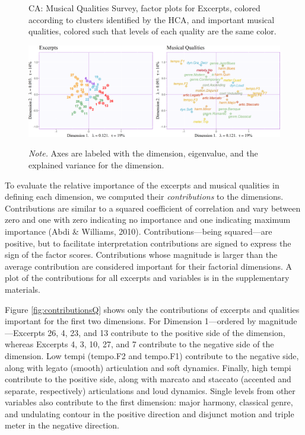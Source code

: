 \documentclass[
  english,
  man,floatsintext]{apa6}
\begin{document}
\begin{figure}   
  \centering  
  \caption{CA: Musical Qualities Survey, factor plots for Excerpts, colored according to clusters identified by the HCA, and important musical qualities, colored such that levels of each quality are the same color.}
    \includegraphics{./Music-Descriptor-Space_files/figure-latex/factormapsQcode-1.png}
  \label{fig:factormapsQ}
  \caption*{\footnotesize \textit{Note.} Axes are labeled with the dimension, eigenvalue, and the explained variance for the dimension. }
\end{figure}

To evaluate the relative importance of the excerpts and musical qualities in defining each dimension, we computed their \emph{contributions} to the dimensions. Contributions are similar to a squared coefficient of correlation and vary between zero and one with zero indicating no importance and one indicating maximum importance (Abdi \& Williams, 2010). Contributions---being squared---are positive, but to facilitate interpretation contributions are signed to express the sign of the factor scores. Contributions whose magnitude is larger than the average contribution are considered important for their factorial dimensions. A plot of the contributions for all excerpts and variables is in the supplementary materials.

Figure \ref{fig:contributionsQ} shows only the contributions of excerpts and qualities important for the first two dimensions. For Dimension 1---ordered by magnitude---Excerpts 26, 4, 23, and 13 contribute to the positive side of the dimension, whereas Excerpts 4, 3, 10, 27, and 7 contribute to the negative side of the dimension. Low tempi (tempo.F2 and tempo.F1) contribute to the negative side, along with legato (smooth) articulation and soft dynamics. Finally, high tempi contribute to the positive side, along with marcato and staccato (accented and separate, respectively) articulations and loud dynamics. Single levels from other variables also contribute to the first dimension: major harmony, classical genre, and undulating contour in the positive direction and disjunct motion and triple meter in the negative direction.
\end{document}
